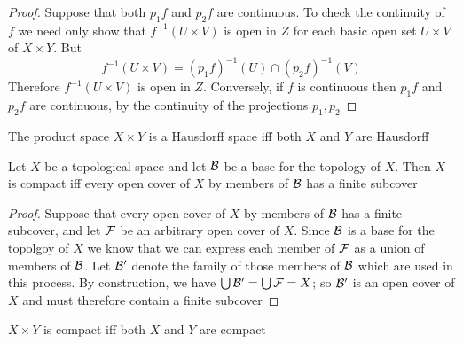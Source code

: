 \documentclass[11pt]{article}
\begin{document}
\begin{proof}
Suppose that both \(p_1f\) and \(p_2f\) are continuous. To check the
continuity of \(f\) we need only show that \(f^{-1}(U\times V)\) is open in
\(Z\) for each basic open set \(U\times V\) of \(X\times Y\). But
\begin{equation*}
f^{-1}(U\times V)=(p_1f)^{-1}(U)\cap(p_2f)^{-1}(V)
\end{equation*}
Therefore \(f^{-1}(U\times V)\) is open in \(Z\). Conversely, if \(f\) is
continuous then \(p_1f\) and \(p_2f\) are continuous, by the continuity of
the projections \(p_1,p_2\)
\end{proof}

\begin{theorem}[]
The product space \(X\times Y\) is a Hausdorff space iff both \(X\) and \(Y\)
are Hausdorff
\end{theorem}



\begin{lemma}[]
Let \(X\) be a topological space and let \(\mathcal{B}\) be a base for the topology
of \(X\). Then \(X\) is compact iff every open cover of \(X\) by members of
\(\mathcal{B}\) has a finite subcover
\end{lemma}

\begin{proof}
Suppose that every open cover of \(X\) by members of \(\mathcal{B}\) has a finite
subcover, and let \(\mathcal{F}\) be an arbitrary open cover of \(X\). Since
\(\mathcal{B}\) is a base for the topolgoy of \(X\) we know that we can express
each member of \(\mathcal{F}\) as a union of members of \(\mathcal{B}\). Let \(\mathcal{B}'\)
denote the family of those members of \(\mathcal{B}\) which are used in this
process. By construction, we have \(\bigcup\mathcal{B}'=\bigcup\mathcal{F}=X\); so
\(\mathcal{B}'\) is an open cover of \(X\) and must therefore contain a finite subcover
\end{proof}

\begin{theorem}[]
\(X\times Y\) is compact iff both \(X\) and \(Y\) are compact
\end{theorem}
\end{document}
